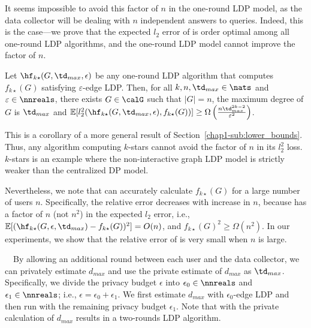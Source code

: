 It seems impossible to avoid this factor of $n$ in the 
one-round 
LDP model, as the data collector will be dealing with $n$ independent answers to
queries. Indeed, this is the case---we prove that the expected $l_2$ error of  
is order optimal among all 
one-round 
LDP algorithms, and 
the 
one-round 
LDP model cannot
improve 
the factor of $n$.

\begin{corollary}\label{chap1-cor:kstars-lb}
  Let 
  $\hf_{k\star}(G,\td_{max},\epsilon)$
  be any 
  one-round 
  LDP algorithm that 
  computes $f_{k\star}(G)$ satisfying $\varepsilon$-edge LDP. Then, for all
  $k,n,\td_{max} \in \nats$ 
  and $\varepsilon \in \nnreals$, there exists $G \in
  \calG$ such that $|G| = n$, the maximum degree of $G$ is 
  $\td_{max}$
  and 
  $\mathbb{E}[l_2^2(\hf_{k\star}(G,\td_{max},\epsilon), f_{k\star}(G))] 
  \geq 
  \Omega\left(\frac{n\td_{max}^{2k-2}}{\varepsilon^2} \right)$.
\end{corollary}

This is a corollary of a more general result of Section~\ref{chap1-sub:lower_bounds}. Thus,
any algorithm computing $k$-stars cannot avoid the factor of $n$ in its $l_2^2$
loss. $k$-stars 
is an example where the non-interactive graph LDP model is strictly weaker than
the centralized DP model.

Nevertheless, we note that  can accurately calculate $f_{k\star}(G)$ for a large number of users $n$. 
Specifically, the relative error decreases with increase in $n$, because  has a factor of $n$ (not $n^2$) in the expected $l_2$ error, i.e., $\mathbb{E}[(\hf_{k\star}(G, \epsilon, \td_{max}) - f_{k\star}(G))^2] = O(n)$, 
and $f_{k\star}(G)^2 \geq \Omega(n^2)$. 
In our experiments, we show that the relative error of  is very small when $n$ is large.

\smallskip
{}~~By allowing an additional round between each user and the data collector, we can privately estimate $d_{max}$ and use the private estimate of $d_{max}$ as $\td_{max}$. 
Specifically, 
we divide the privacy budget $\epsilon$ into 
$\epsilon_0 \in \nnreals$ and $\epsilon_1 \in \nnreals$; i.e., $\epsilon = \epsilon_0 + \epsilon_1$. 
We first estimate $d_{max}$ with $\epsilon_0$-edge LDP and then run  with the remaining privacy budget $\epsilon_1$. 
Note that  with the private calculation of $d_{max}$ results in a two-rounds LDP algorithm.

